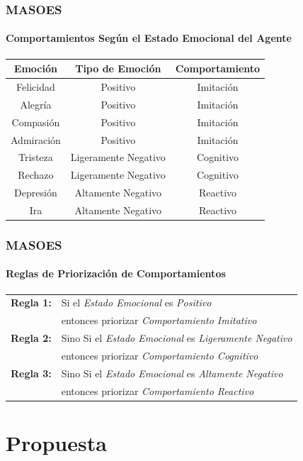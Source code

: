 \documentclass{beamer}
\begin{document}
\begin{frame}
\frametitle{MASOES}
\framesubtitle{Comportamientos Según el Estado Emocional del Agente}
\begin{table}[!ht]
\centering
\scriptsize
\begin{tabular}{ccc}
\hline
\bfseries Emoción & \bfseries Tipo de Emoción & \bfseries Comportamiento \\
\hline\hline
Felicidad & Positivo & Imitación \\
Alegría & Positivo & Imitación \\
Compasión & Positivo & Imitación \\
Admiración & Positivo & Imitación \\
Tristeza & Ligeramente Negativo & Cognitivo \\
Rechazo & Ligeramente Negativo & Cognitivo \\
Depresión & Altamente Negativo & Reactivo \\
Ira & Altamente Negativo & Reactivo \\
\hline
\end{tabular}
\end{table}
\end{frame}

\begin{frame}
\frametitle{MASOES}
\framesubtitle{Reglas de Priorización de Comportamientos}
\begin{table}[!ht]
\centering
\scriptsize
\begin{tabular}{ll}
\hline
\textbf{Regla 1:} & Si el \textit{Estado Emocional} es \textit{Positivo} \\
& entonces priorizar \textit{Comportamiento Imitativo} \\
\textbf{Regla 2:} & Sino Si el \textit{Estado Emocional} es \textit{Ligeramente Negativo} \\
& entonces priorizar \textit{Comportamiento Cognitivo} \\
\textbf{Regla 3:} & Sino Si el \textit{Estado Emocional} es \textit{Altamente Negativo} \\
& entonces priorizar \textit{Comportamiento Reactivo} \\
\hline
\end{tabular}
\end{table}
\end{frame}

\section{Propuesta}
\end{document}
